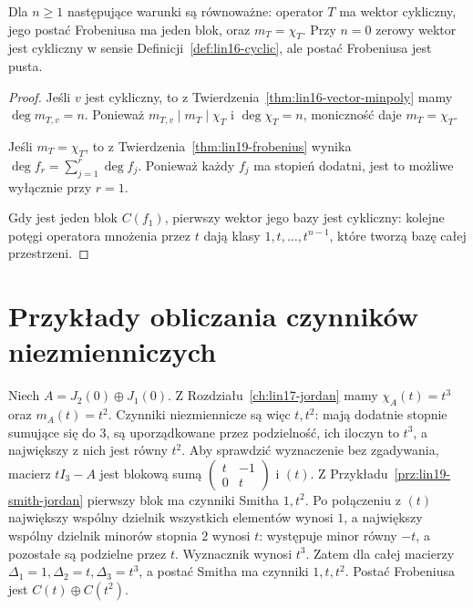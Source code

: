 \begin{wniosek}
\label{cor:lin19-cyclic}
Dla \(n\ge1\) następujące warunki
są równoważne:
operator \(T\) ma wektor cykliczny,
jego postać Frobeniusa ma jeden blok,
oraz \(m_T=\chi_T\).
Przy \(n=0\) zerowy wektor jest cykliczny
w sensie Definicji~\ref{def:lin16-cyclic},
ale postać Frobeniusa jest pusta.
\end{wniosek}
\begin{proof}
Jeśli \(v\) jest cykliczny,
to z Twierdzenia~\ref{thm:lin16-vector-minpoly}
mamy \(\deg m_{T,v}=n\).
Ponieważ \(m_{T,v}\mid m_T\mid\chi_T\)
i \(\deg\chi_T=n\),
moniczność daje \(m_T=\chi_T\).

Jeśli \(m_T=\chi_T\),
to z Twierdzenia~\ref{thm:lin19-frobenius}
wynika
\(\deg f_r=\sum_{j=1}^r\deg f_j\).
Ponieważ każdy \(f_j\) ma stopień dodatni,
jest to możliwe wyłącznie przy \(r=1\).

Gdy jest jeden blok \(C(f_1)\),
pierwszy wektor jego bazy
jest cykliczny: kolejne potęgi operatora
mnożenia przez \(t\)
dają klasy \(1,t,\ldots,t^{n-1}\),
które tworzą bazę całej przestrzeni.
\end{proof}

\section{Przykłady obliczania czynników niezmienniczych}
\label{sec:lin19-examples}

\begin{przyklad}
\label{prz:lin19-nilpotent}
Niech \(A=J_2(0)\oplus J_1(0)\).
Z Rozdziału~\ref{ch:lin17-jordan}
mamy
\(\chi_A(t)=t^3\) oraz \(m_A(t)=t^2\).
Czynniki niezmiennicze są więc \(t,t^2\):
mają dodatnie stopnie sumujące się do \(3\),
są uporządkowane przez podzielność,
ich iloczyn to \(t^3\), a największy
z nich jest równy \(t^2\).
Aby sprawdzić wyznaczenie bez zgadywania,
macierz \(tI_3-A\) jest blokową sumą
\(\begin{pmatrix}t&-1\\0&t\end{pmatrix}\)
i \((t)\).
Z Przykładu~\ref{prz:lin19-smith-jordan}
pierwszy blok ma czynniki Smitha \(1,t^2\).
Po połączeniu z \((t)\)
największy wspólny dzielnik wszystkich
elementów wynosi \(1\),
a największy wspólny dzielnik
minorów stopnia \(2\) wynosi \(t\):
występuje minor równy \(-t\),
a pozostałe są podzielne przez \(t\).
Wyznacznik wynosi \(t^3\).
Zatem dla całej macierzy
\(\Delta_1=1,\Delta_2=t,\Delta_3=t^3\),
a postać Smitha ma czynniki \(1,t,t^2\).
Postać Frobeniusa jest
\(C(t)\oplus C(t^2)\).
\end{przyklad}

